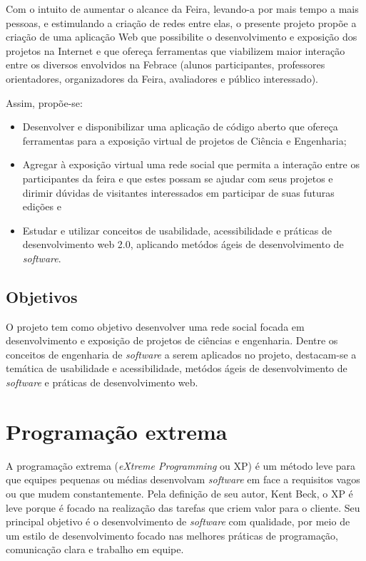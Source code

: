 \documentclass[a4paper,12pt,font=plain,header=plain]{abnt}
\begin{document}
	Com o intuito de aumentar o alcance da Feira, levando-a por mais tempo a mais pessoas, e estimulando a criação de redes entre elas, o presente projeto propõe a criação de uma aplicação Web que possibilite o desenvolvimento e exposição dos projetos na Internet e que ofereça ferramentas que viabilizem maior interação entre os diversos envolvidos na Febrace (alunos participantes, professores orientadores, organizadores da Feira, avaliadores e público interessado).

	Assim, propõe-se:

	\begin{itemize}
	\item{
		Desenvolver e disponibilizar uma aplicação de código aberto que ofereça ferramentas para a exposição virtual de projetos de Ciência e Engenharia;
	}
	\item{
		Agregar à exposição virtual uma rede social que permita a interação entre os participantes da feira e que estes possam se ajudar com seus projetos e dirimir dúvidas de visitantes interessados em participar de suas futuras edições e
	}
	\item{
		Estudar e utilizar conceitos de usabilidade, acessibilidade e práticas de desenvolvimento web 2.0, aplicando metódos ágeis de desenvolvimento de \textit{software}.
	}
	\end{itemize}

	\section{Objetivos}
	O projeto tem como objetivo desenvolver uma rede social focada em desenvolvimento e exposição de projetos de ciências e engenharia. Dentre os conceitos de engenharia de \textit{software} a serem aplicados no projeto, destacam-se a temática de usabilidade e acessibilidade, metódos ágeis de desenvolvimento de \textit{software} e práticas de desenvolvimento web.


	\chapter{Programação extrema}
	A programação extrema (\textit{eXtreme Programming} ou XP) é um método leve para que equipes pequenas ou médias desenvolvam \textit{software} em face a requisitos vagos ou que mudem constantemente\cite{beck04}. Pela definição de seu autor, Kent Beck, o XP é leve porque é focado na realização das tarefas que criem valor para o cliente. Seu principal objetivo é o desenvolvimento de \textit{software} com qualidade, por meio de um estilo de desenvolvimento focado nas melhores práticas de programação, comunicação clara e trabalho em equipe.
\end{document}
